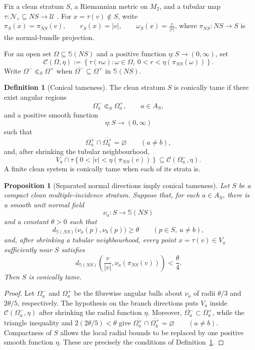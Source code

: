 \documentclass[11pt]{article}
\theoremstyle{plain}
\newtheorem{proposition}[theorem]{Proposition}
\theoremstyle{definition}
\newtheorem{definition}[theorem]{Definition}
\begin{document}
Fix a clean stratum \(S\), a Riemannian metric on \(M_2\), and a
tubular map
\(\tau: \mathcal N_\varepsilon \subseteq NS \longrightarrow \mathcal U\)
\citep{Lee2012SmoothManifolds}. For
\(x=\tau(v)\notin S\),
write
\(\pi_S(x)=\pi_{NS}(v), \qquad r_S(x)=|v|, \qquad \omega_S(x)=\frac{v}{|v|}\),
where \(\pi_{NS}:NS\longrightarrow S\) is the normal-bundle projection.

For an open set \(\Omega\subseteq\mathbb S(NS)\) and a positive function
\(\eta:S\longrightarrow(0,\infty)\),
set
\[
  \mathcal C(\Omega,\eta)
  :=
  \left\{
    \tau(r\omega):
    \omega\in\Omega,\
    0<r<\eta(\pi_{NS}(\omega))
  \right\}.
\]
Write \(\Omega^-\Subset_S\Omega^+\) when \(\overline{\Omega^-} \subseteq \Omega^+\) in \(\mathbb S(NS)\).

\begin{definition}[Conical tameness]
\label{def:conical-tameness}
The clean stratum \(S\) is conically tame if there exist angular
regions
\[
  \Omega_a^-\Subset_S\Omega_a^+,
  \qquad
  a\in A_S,
\]
and a positive smooth function
\[
  \eta:S\longrightarrow(0,\infty)
\]
such that
\[
  \overline{\Omega_a^+}
  \cap
  \overline{\Omega_b^+}
  =
  \varnothing
  \qquad
  (a\neq b),
\]
and, after shrinking the tubular neighbourhood,
\[
  V_a
  \cap
  \tau
  \left\{
    0<|v|<\eta(\pi_{NS}(v))
  \right\}
  \subseteq
  \mathcal C(\Omega_a^-,\eta).
\]
A finite clean system is conically tame when each of its strata is.
\end{definition}

\begin{proposition}[Separated normal directions imply conical tameness]
\label{prop:separated-normal-directions-conical}
Let \(S\) be a compact clean multiple-incidence stratum. Suppose that, for
each \(a\in A_S\), there is a smooth unit normal field
\[
  \nu_a:S\longrightarrow\mathbb S(NS)
\]
and a constant \(\theta>0\) such that
\[
  d_{\mathbb S(NS)}\bigl(\nu_a(p),\nu_b(p)\bigr)\geq\theta
  \qquad
  (p\in S,\ a\neq b),
\]
and, after shrinking a tubular neighbourhood, every point
\(x=\tau(v)\in V_a\) sufficiently near \(S\) satisfies
\[
  d_{\mathbb S(NS)}
  \left(
    \frac{v}{|v|},
    \nu_a(\pi_{NS}(v))
  \right)
  <\frac{\theta}{4}.
\]
Then \(S\) is conically tame.
\end{proposition}

\begin{proof}
Let \(\Omega_a^-\) and \(\Omega_a^+\) be the fibrewise angular balls about
\(\nu_a\) of radii \(\theta/3\) and \(2\theta/5\), respectively. The
hypothesis on the branch directions puts \(V_a\) inside
\(\mathcal C(\Omega_a^-,\eta)\) after shrinking the radial function
\(\eta\). Moreover,
\(\overline{\Omega_a^-}\subset\Omega_a^+\),
while the triangle inequality and
\(2(2\theta/5)<\theta\) give
\(\overline{\Omega_a^+}\cap\overline{\Omega_b^+}=\varnothing \qquad(a\neq b)\).
Compactness of \(S\) allows the local radial bounds to be replaced by one
positive smooth function \(\eta\). These are precisely the conditions of
Definition~\ref{def:conical-tameness}.
\end{proof}
\end{document}
